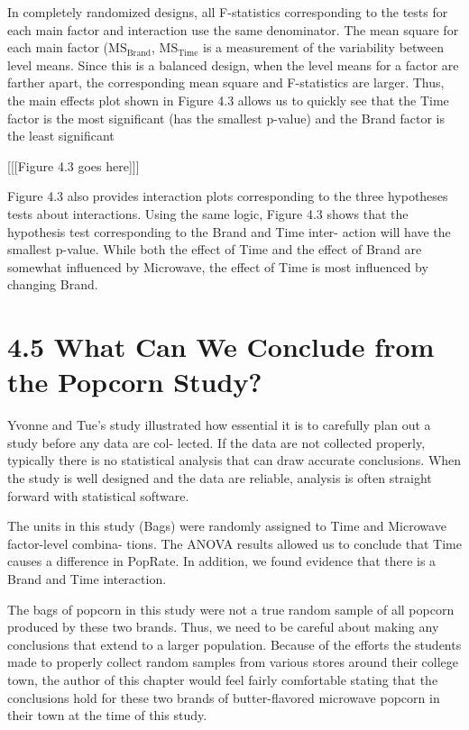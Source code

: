 \documentclass[
]{report}
\begin{document}
In completely randomized designs, all F-statistics corresponding to the tests for each main factor and
interaction use the same denominator. The mean square for each main factor (\(\mathrm{MS}_{\mathrm{Brand}}\), \(\mathrm{MS}_{\mathrm{Time}}\) is a measurement of the variability between level means. Since this is a balanced design, when the level means
for a factor are farther apart, the corresponding mean square and F-statistics are larger. Thus, the main effects
plot shown in Figure 4.3 allows us to quickly see that the Time factor is the most significant (has the smallest
p-value) and the Brand factor is the least significant

{[}{[}{[}Figure 4.3 goes here{]}{]}{]}

Figure 4.3 also provides interaction plots corresponding to the three hypotheses tests about interactions.
Using the same logic, Figure 4.3 shows that the hypothesis test corresponding to the Brand and Time inter-
action will have the smallest p-value. While both the effect of Time and the effect of Brand are somewhat
influenced by Microwave, the effect of Time is most influenced by changing Brand.

\chapter{4.5 What Can We Conclude from the Popcorn Study?}\label{what-can-we-conclude-from-the-popcorn-study}

Yvonne and Tue's study illustrated how essential it is to carefully plan out a study before any data are col-
lected. If the data are not collected properly, typically there is no statistical analysis that can draw accurate
conclusions. When the study is well designed and the data are reliable, analysis is often straight forward with
statistical software.

The units in this study (Bags) were randomly assigned to Time and Microwave factor-level combina-
tions. The ANOVA results allowed us to conclude that Time causes a difference in PopRate. In addition, we
found evidence that there is a Brand and Time interaction.

The bags of popcorn in this study were not a true random sample of all popcorn produced by these two
brands. Thus, we need to be careful about making any conclusions that extend to a larger population. Because
of the efforts the students made to properly collect random samples from various stores around their college
town, the author of this chapter would feel fairly comfortable stating that the conclusions hold for these two
brands of butter-flavored microwave popcorn in their town at the time of this study.
\end{document}
